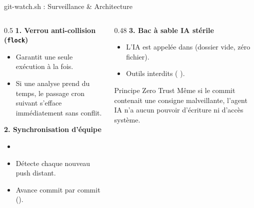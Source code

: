 \documentclass[aspectratio=169,10pt,t]{beamer}
\begin{document}
\begin{frame}[fragile]{git-watch.sh : Surveillance \& Architecture}
\begin{columns}[T]\begin{column}{0.5\textwidth}
\textbf{1. Verrou anti-collision (\texttt{flock})}
\begin{itemize}
\item Garantit une seule ex\'ecution \`a la fois.
\item Si une analyse prend du temps, le passage cron suivant s'efface imm\'ediatement sans conflit.
\end{itemize}
\vspace{0.25cm}
\textbf{2. Synchronisation d'\'equipe}
\begin{itemize}
\item {}
\item D\'etecte chaque nouveau push distant.
\item Avance commit par commit ().
\end{itemize}
\end{column}\begin{column}{0.48\textwidth}
\textbf{3. Bac \`a sable IA st\'erile}
\begin{itemize}
\item L'IA est appel\'ee dans  (dossier vide, z\'ero fichier).
\item Outils interdits (  ).
\end{itemize}
\vspace{0.2cm}
\begin{block}{Principe Zero Trust}
M\^eme si le commit contenait une consigne malveillante, l'agent IA n'a aucun pouvoir d'\'ecriture ni d'acc\`es syst\`eme.
\end{block}
\end{column}\end{columns}
\end{frame}
\end{document}
